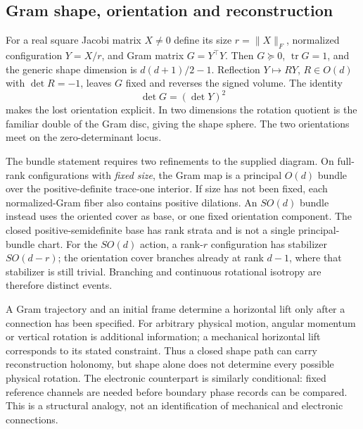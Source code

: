 \documentclass[11pt]{article}
\newcommand{\tr}{\operatorname{tr}}
\begin{document}
\subsection{Gram shape, orientation and reconstruction}
For a real square Jacobi matrix $X\ne0$ define its size $r=\|X\|_F$, normalized configuration $Y=X/r$, and Gram matrix $G=Y^\top Y$. Then $G\succeq0$, $\tr G=1$, and the generic shape dimension is $d(d+1)/2-1$. Reflection $Y\mapsto RY$, $R\in O(d)$ with $\det R=-1$, leaves $G$ fixed and reverses the signed volume. The identity
\begin{equation}
\det G=(\det Y)^2
\end{equation}
makes the lost orientation explicit. In two dimensions the rotation quotient is the familiar double of the Gram disc, giving the shape sphere. The two orientations meet on the zero-determinant locus.

The bundle statement requires two refinements to the supplied diagram. On full-rank configurations with \emph{fixed size}, the Gram map is a principal $O(d)$ bundle over the positive-definite trace-one interior. If size has not been fixed, each normalized-Gram fiber also contains positive dilations. An $SO(d)$ bundle instead uses the oriented cover as base, or one fixed orientation component. The closed positive-semidefinite base has rank strata and is not a single principal-bundle chart. For the $SO(d)$ action, a rank-$r$ configuration has stabilizer $SO(d-r)$; the orientation cover branches already at rank $d-1$, where that stabilizer is still trivial. Branching and continuous rotational isotropy are therefore distinct events.

A Gram trajectory and an initial frame determine a horizontal lift only after a connection has been specified. For arbitrary physical motion, angular momentum or vertical rotation is additional information; a mechanical horizontal lift corresponds to its stated constraint. Thus a closed shape path can carry reconstruction holonomy, but shape alone does not determine every possible physical rotation. The electronic counterpart is similarly conditional: fixed reference channels are needed before boundary phase records can be compared. This is a structural analogy, not an identification of mechanical and electronic connections.
\end{document}
